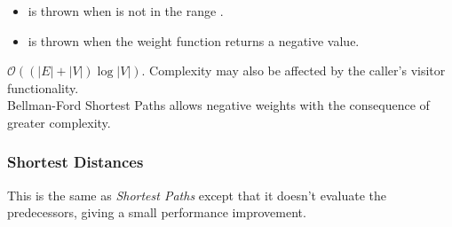 \begin{itemdescr}
\begin{itemize}
                  \item {} is thrown when  is not in the range .
                  \item {} is thrown when the weight function returns a negative value.
            \end{itemize}
      \pnum\complexity
                        $\mathcal{O}((|E| + |V|)\log{|V|})$. 
                        Complexity may also be affected by the caller's visitor functionality. \\
      \pnum\remarks 
                        Bellman-Ford Shortest Paths allows negative weights with the consequence of greater complexity. \\
\end{itemdescr}

\subsubsection{Shortest Distances}
This is the same as \textit{Shortest Paths} except that it doesn't evaluate the predecessors,
giving a small performance improvement.

{\small
      
}

